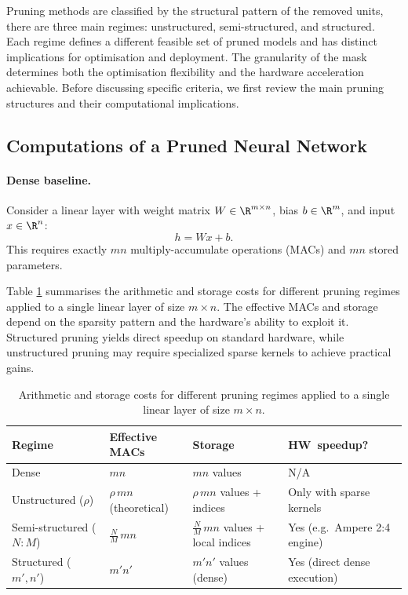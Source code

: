 Pruning methods are classified by the structural pattern of the removed units, there are three main regimes: unstructured, semi-structured, and structured.  Each regime defines a different feasible set of pruned models and has distinct implications for optimisation and deployment.
The granularity of the mask determines both the optimisation flexibility and
the hardware acceleration achievable.
Before discussing specific criteria, we first review the main pruning structures and their computational implications.
\subsection{Computations of a Pruned Neural Network}
\paragraph{Dense baseline.}
Consider a linear layer with weight matrix $W \in \R^{m \times n}$, bias
$b \in \R^m$, and input $x \in \R^n$:
\begin{equation}
	h = Wx + b.
	\label{eq:dense_linear}
\end{equation}
This requires exactly $mn$ multiply-accumulate operations (MACs) and $mn$
stored parameters.

Table \ref{tab:compute_summary} summarises the arithmetic and storage costs for different pruning regimes applied to a single linear layer of size $m \times n$.  The effective MACs and storage depend on the sparsity pattern and the hardware's ability to exploit it.  Structured pruning yields direct speedup on standard hardware, while unstructured pruning may require specialized sparse kernels to achieve practical gains.
\begin{table}[H]
	\centering
	\caption{Arithmetic and storage costs for different pruning regimes applied
		to a single linear layer of size $m \times n$.}
	\label{tab:compute_summary}
	\renewcommand{\arraystretch}{1.4}
	\begin{tabularx}{\textwidth}{lXXX}
		\toprule
		\textbf{Regime} & \textbf{Effective MACs} & \textbf{Storage}
		& \textbf{HW~speedup?} \\
		\midrule
		Dense            & $mn$
		& $mn$ values
		& N/A \\
		Unstructured ($\rho$)
		& $\rho\,mn$ (theoretical)
		& $\rho\,mn$ values + indices
		& Only with sparse kernels \\
		Semi-structured ($N\!:\!M$)
		& $\frac{N}{M}\,mn$
		& $\frac{N}{M}\,mn$ values + local indices
		& Yes (e.g.\ Ampere 2:4 engine) \\
		Structured ($m',n'$)
		& $m'n'$
		& $m'n'$ values (dense)
		& Yes (direct dense execution) \\
		\bottomrule
	\end{tabularx}
\end{table}

